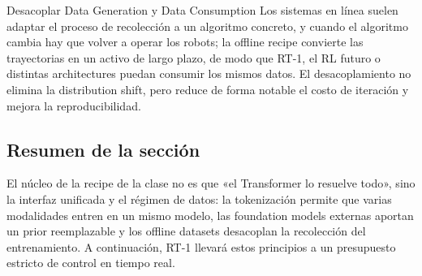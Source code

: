 
\begin{importantbox}{Desacoplar Data Generation y Data Consumption}
Los sistemas en línea suelen adaptar el proceso de recolección a un algoritmo concreto, y cuando el algoritmo cambia hay que volver a operar los robots; la offline recipe convierte las trayectorias en un activo de largo plazo, de modo que RT-1, el RL futuro o distintas architectures puedan consumir los mismos datos. El desacoplamiento no elimina la distribution shift, pero reduce de forma notable el costo de iteración y mejora la reproducibilidad.
\end{importantbox}

\subsection{Resumen de la sección}

El núcleo de la recipe de la clase no es que «el Transformer lo resuelve todo», sino la interfaz unificada y el régimen de datos: la tokenización permite que varias modalidades entren en un mismo modelo, las foundation models externas aportan un prior reemplazable y los offline datasets desacoplan la recolección del entrenamiento. A continuación, RT-1 llevará estos principios a un presupuesto estricto de control en tiempo real.
